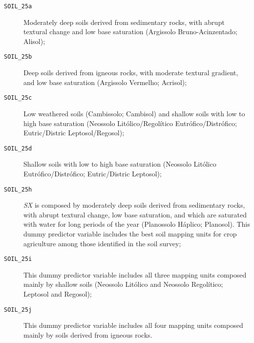\begin{description}
 \item[\texttt{SOIL\_25a}] Moderately deep soils derived from sedimentary rocks, with abrupt 
 textural change and low base saturation (Argissolo Bruno-Acinzentado; Alisol);

 \item[\texttt{SOIL\_25b}] Deep soils derived from igneous rocks, with moderate textural gradient, 
 and low base saturation (Argissolo Vermelho; Acrisol);
 
 \item[\texttt{SOIL\_25c}] Low weathered soils (Cambissolo; Cambisol) and shallow soils with low to 
 high base saturation (Neossolo Litólico/Regolítico Eutrófico/Distrófico; Eutric/Distric 
 Leptosol/Regosol);
 
 \item[\texttt{SOIL\_25d}] Shallow soils with low to high base saturation (Neossolo Litólico 
 Eutrófico/Distrófico; Eutric/Distric Leptosol);
 
 
 
 
 \item[\texttt{SOIL\_25h}] \textit{SX} is composed by moderately deep soils derived from sedimentary 
 rocks, with abrupt textural change, low base saturation, and which are saturated with water for 
 long periods of the year (Planossolo Háplico; Planosol). This dummy predictor variable includes 
 the best soil mapping units for crop agriculture among those identified in the soil survey;
 
 \item[\texttt{SOIL\_25i}] This dummy predictor variable includes all three mapping units composed 
 mainly by shallow soils (Neossolo Litólico and Neossolo Regolítico; Leptosol and Regosol);
  
 \item[\texttt{SOIL\_25j}] This dummy predictor variable includes all four mapping units composed 
 mainly by soils derived from igneous rocks.
\end{description}

